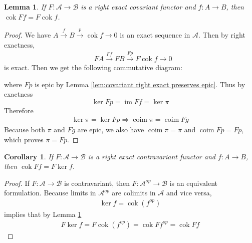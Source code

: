 \documentclass{article}
\newcommand{\fA}{\mathscr{A}}
\newcommand{\fB}{\mathscr{B}}
\DeclareMathOperator{\im}{\mathrm{im}}
\DeclareMathOperator{\coim}{\mathrm{coim}}
\DeclareMathOperator{\cok}{\mathrm{cok}}
\newtheorem{corollary}{Corollary}[theorem]
\newtheorem{lemma}[theorem]{Lemma}
\begin{document}
\begin{lemma}\label{lem:covariant right exact commutes with cok}
    If $F:\fA \to \fB$ is a right exact covariant functor and $f:A\to B$, then $\cok Ff=F\cok f$.
\end{lemma}
\begin{proof}
    We have $A\xrightarrow{f}B \xrightarrow{p}\cok f\rightarrow 0$ is an exact sequence in $\fA$. Then by right exactness,
    \begin{align*}
        &FA \xrightarrow{Ff} FB\xrightarrow{Fp}F\cok f\rightarrow0
    \end{align*}
    is exact. Then we get the following commutative diagram:
    \begin{center}
    \end{center}
    where $Fp$ is epic by Lemma \ref{lem:covariant right exact preserves epic}. Thus by exactness
    \[
    \ker Fp=\im Ff=\ker \pi
    \]
    Therefore
    \begin{align*}
        \ker \pi=\ker Fp\Rightarrow \coim \pi=\coim Fg
    \end{align*}
    Because both $\pi$ and $Fg$ are epic, we also have $\coim \pi=\pi$ and $\coim Fp=Fp$, which proves $\pi=Fp$.
\end{proof}
\begin{corollary}\label{cor:contravariant right exact and ker to cok}
    If $F:\fA \to \fB$ is a right exact contravariant functor and $f:A\to B$, then $\cok Ff=F\ker f$.
\end{corollary}
\begin{proof}
    If $F:\fA \to \fB$ is contravariant, then $F:\fA^{op}\to \fB$ is an equivalent formulation. Because limits in $\fA^{op}$ are colimits in $\fA$ and vice versa,
    \begin{align*}
        \ker f=\cok (f^{op})
    \end{align*}
    implies that by Lemma \ref{lem:covariant right exact commutes with cok}
    \begin{align*}
        F\ker f=F\cok (f^{op})=\cok Ff^{op}=\cok Ff
    \end{align*}
\end{proof}
\end{document}
